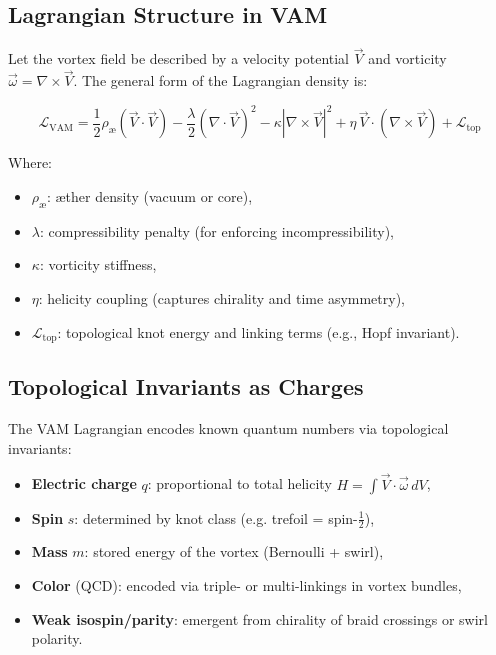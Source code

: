 \documentclass[preprint]{revtex4-2}
\begin{document}
\subsection{Lagrangian Structure in VAM}

Let the vortex field be described by a velocity potential \( \vec{V} \) and vorticity \( \vec{\omega} = \nabla \times \vec{V} \). The general form of the Lagrangian density is:

\begin{equation}
\mathcal{L}_{\text{VAM}} = \frac{1}{2} \rho_\text{\ae} \left( \vec{V} \cdot \vec{V} \right)
- \frac{\lambda}{2} \left( \nabla \cdot \vec{V} \right)^2
- \kappa \left| \nabla \times \vec{V} \right|^2
+ \eta \, \vec{V} \cdot (\nabla \times \vec{V}) + \mathcal{L}_{\text{top}}
\end{equation}

Where:
\begin{itemize}
    \item \( \rho_\text{\ae} \): æther density (vacuum or core),
    \item \( \lambda \): compressibility penalty (for enforcing incompressibility),
    \item \( \kappa \): vorticity stiffness,
    \item \( \eta \): helicity coupling (captures chirality and time asymmetry),
    \item \( \mathcal{L}_{\text{top}} \): topological knot energy and linking terms (e.g., Hopf invariant).
\end{itemize}

\subsection{Topological Invariants as Charges}

The VAM Lagrangian encodes known quantum numbers via topological invariants:

\begin{itemize}
    \item \textbf{Electric charge} \( q \): proportional to total helicity \( H = \int \vec{V} \cdot \vec{\omega} \, dV \),
    \item \textbf{Spin} \( s \): determined by knot class (e.g. trefoil = spin-\( \frac{1}{2} \)),
    \item \textbf{Mass} \( m \): stored energy of the vortex (Bernoulli + swirl),
    \item \textbf{Color} (QCD): encoded via triple- or multi-linkings in vortex bundles,
    \item \textbf{Weak isospin/parity}: emergent from chirality of braid crossings or swirl polarity.
\end{itemize}
\end{document}
